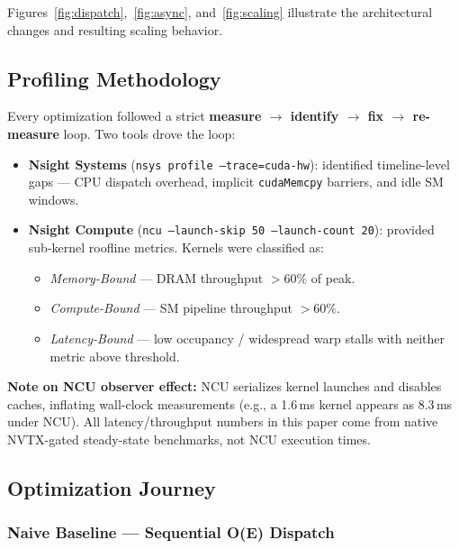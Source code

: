 Figures~\ref{fig:dispatch},~\ref{fig:async}, and~\ref{fig:scaling} illustrate the architectural changes and resulting scaling behavior.

\subsection{Profiling Methodology}

Every optimization followed a strict \textbf{measure $\to$ identify $\to$ fix $\to$ re-measure} loop. Two tools drove the loop:

\begin{itemize}
  \item \textbf{Nsight Systems} (\texttt{nsys profile --trace=cuda-hw}): identified timeline-level gaps — CPU dispatch overhead, implicit \texttt{cudaMemcpy} barriers, and idle SM windows.
  \item \textbf{Nsight Compute} (\texttt{ncu --launch-skip 50 --launch-count 20}): provided sub-kernel roofline metrics. Kernels were classified as:
  \begin{itemize}
    \item \textit{Memory-Bound} — DRAM throughput $>60\%$ of peak.
    \item \textit{Compute-Bound} — SM pipeline throughput $>60\%$.
    \item \textit{Latency-Bound} — low occupancy / widespread warp stalls with neither metric above threshold.
  \end{itemize}
\end{itemize}

\textbf{Note on NCU observer effect:} NCU serializes kernel launches and disables caches, inflating wall-clock measurements (e.g., a 1.6\,ms kernel appears as 8.3\,ms under NCU). All latency/throughput numbers in this paper come from native NVTX-gated steady-state benchmarks, not NCU execution times.

\subsection{Optimization Journey}

\subsubsection*{Naive Baseline — Sequential O(E) Dispatch}

